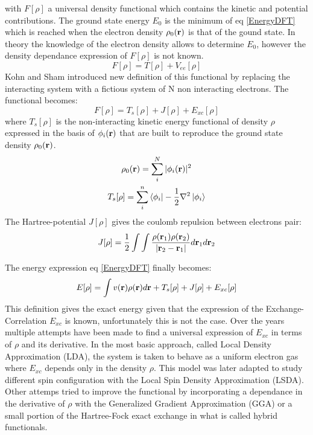 \documentclass[12pt]{report}
\numberwithin{equation}{section}
\begin{document}
with $F[\rho]$ a universal density functional which contains the kinetic and potential contributions.
The ground state energy $E_0$ is the minimum of eq \ref{EnergyDFT} which is reached when the electron density $\rho_0(\vb r)$ is that of the gound state.
In theory the knowledge of the electron density allows to determine $E_0$, however the density dependance expression of $F[\rho]$ is not known.
\begin{equation}
    F[\rho]=T[\rho]+V_{ee}[\rho]
\end{equation}
Kohn and Sham introduced new definition of this functional by replacing the interacting system with a fictious system of N non interacting electrons.%
The functional becomes:
\begin{equation}
    F[\rho]=T_s[\rho]+J[\rho]+E_{xc}[\rho]
\end{equation}
where $T_s[\rho]$ is the non-interacting kinetic energy functional of density $\rho$ expressed in the basis of $\phi_i (\vb r)$ that are built to reproduce the ground state density $\rho_0(\vb r)$.
\begin{gather}
    \rho_0(\vb r) = \sum_{i}^{N} |\phi_i (\vb r)|^2\\
    T_s[\rho]=\sum_{i}^{n} \bra{\phi_i} -\frac{1}{2}\nabla^2 \ket{\phi_i}
\end{gather}
The Hartree-potential $J[\rho]$ gives the coulomb repulsion between electrons pair:
\begin{equation}
    J[\rho]=\frac{1}{2}\int\int \frac{\rho(\vb r_1) \rho(\vb r_2)}{|\vb r_2 - \vb r_1 |} d\vb r_1 d\vb r_2
\end{equation}

The energy expression eq \ref{EnergyDFT} finally becomes:
\begin{equation}
    E[\rho]= \int v(\vb r) \rho(\vb r) d\vb r + T_s[\rho] + J[\rho]+ E_{xc}[\rho]
\end{equation}
This definition gives the exact energy given that the expression of the Exchange-Correlation $E_{xc}$ is known, unfortunately this is not the case. 
Over the years multiple attempts have been made to find a universal expression of $E_{xc}$ in terms of $\rho$ and its derivative. 
In the most basic approach, called Local Density Approximation (LDA), the system is taken to behave as a uniform electron gas where $E_{xc}$ depends only in the density $\rho$. 
This model was later adapted to study different spin configuration with the Local Spin Density Approximation (LSDA).
Other attemps tried to improve the functional by incorporating a dependance in the derivative of $\rho$ with the Generalized Gradient Approximation (GGA) or a small portion of the Hartree-Fock exact exchange in what is called hybrid functionals.
\end{document}
